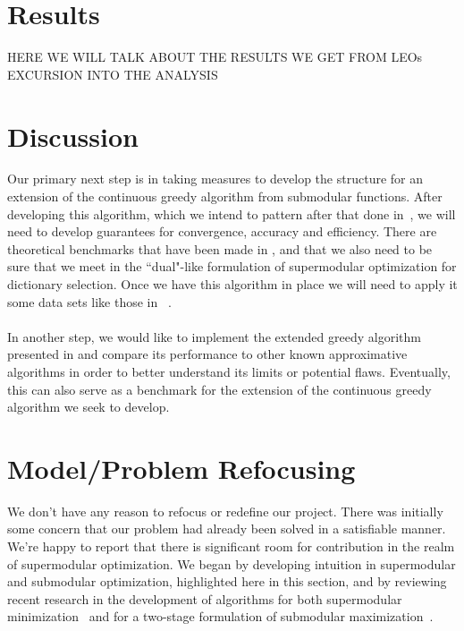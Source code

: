 \documentclass{article}
\begin{document}
\section{Results}\label{sec:results}

HERE WE WILL TALK ABOUT THE RESULTS WE GET FROM LEOs EXCURSION INTO THE ANALYSIS


\section{Discussion}\label{sec:discuss}

Our primary next step is in taking measures to develop the structure for an extension of the continuous greedy algorithm from submodular functions. After developing this algorithm, which we intend to pattern after that done in~\cite{Singer16TwoStage}, we will need to develop guarantees for convergence, accuracy and efficiency. There are theoretical benchmarks that have been made in \cite{greedy_selection}, \cite{Krause05near-optimalnonmyopic} and \cite{nonconvexrelax} that we also need to be sure that we meet in the ``dual"-like formulation of supermodular optimization for dictionary selection. Once we have this algorithm in place we will need to apply it some data sets like those in ~\cite{Singer16TwoStage}.
\\
\\
In another step, we would like to implement the extended greedy algorithm presented in \cite{weaklyalpha} and compare its performance to other known approximative algorithms in order to better understand its limits or potential flaws. Eventually, this can also serve as a benchmark for the extension of the continuous greedy algorithm we seek to develop.

\section{Model/Problem Refocusing} \label{model}
We don't have any reason to refocus or redefine our project. There was initially some concern that our problem had already been solved in a satisfiable manner. We're happy to report that there is significant room for contribution in the realm of supermodular optimization. We began by developing intuition in supermodular and submodular optimization, highlighted here in this section, and by reviewing recent research in the development of algorithms for both supermodular minimization~\cite{weaklyalpha} and for a two-stage formulation of submodular maximization~\cite{Singer16TwoStage}. 
\end{document}
